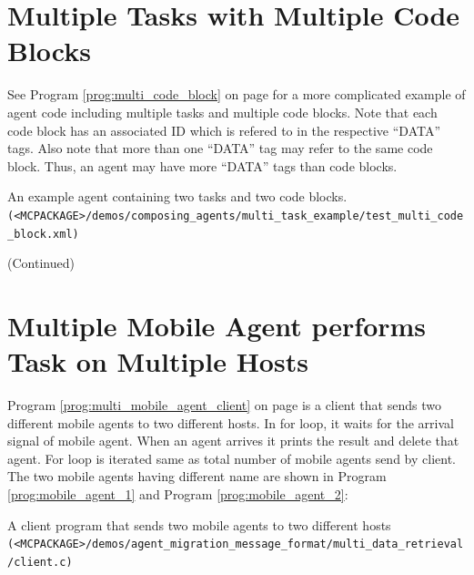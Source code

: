 \documentclass[11pt]{report}
\begin{document}
\section{Multiple Tasks with Multiple Code Blocks}
See Program \ref{prog:multi_code_block} on page \pageref{prog:multi_code_block}
for a more complicated example of agent code including multiple tasks and
  multiple code blocks. Note that each code block has an associated ID which is 
  refered to in the respective ``DATA'' tags. Also note that more than one ``DATA'' tag
  may refer to the same code block. Thus, an agent may have more ``DATA'' tags than
  code blocks.

\begin{Program}[p]
\begin{center}
   {\footnotesize \linespread{1.0} 
     }
\end{center}
\caption{An example agent containing two tasks and two code blocks. 
  \texttt{(<MCPACKAGE>/demos/composing\_agents/multi\_task\_example/test\_multi\_code\_block.xml)}} 
\label{prog:multi_code_block}
\end{Program}
\addtocounter{Program}{-1}
\begin{Program}[p]
\begin{center}
   {\footnotesize \linespread{1.0} 
     }
\end{center}
\caption{ (Continued) }
\end{Program}

\section {Multiple Mobile Agent performs Task on Multiple Hosts}
Program \ref{prog:multi_mobile_agent_client} on page \pageref{prog:multi_mobile_agent_client} is a client that sends two different mobile agents to two different hosts. In for loop, it waits for the arrival signal of mobile agent. When an agent arrives it prints the result and delete that agent. For loop is iterated same as total number of mobile agents send by client. The two mobile agents having different name are shown in Program \ref{prog:mobile_agent_1} and Program \ref{prog:mobile_agent_2}:  

\begin{Program}[p]
\begin{center}
   {\footnotesize \linespread{1.0}
     }
\end{center}
\caption{A client program that sends two mobile agents to two different hosts
  \texttt{(<MCPACKAGE>/demos/agent\_migration\_message\_format/multi\_data\_retrieval/client.c)}}
\label{prog:multi_mobile_agent_client}
\end{Program}
\end{document}
